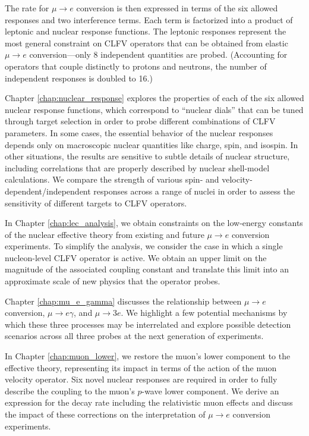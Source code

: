 \documentclass[12pt,letterpaper]{book}
\begin{document}
The rate for $\mu\rightarrow e$ conversion is then expressed in terms of the six allowed responses and two interference terms. Each term is factorized into a product of leptonic and nuclear response functions. The leptonic responses represent the most general constraint on CLFV operators that can be obtained from elastic $\mu\rightarrow e$ conversion---only 8 independent quantities are probed. (Accounting for operators that couple distinctly to protons and neutrons, the number of independent responses is doubled to 16.) 

Chapter \ref{chap:nuclear_response} explores the properties of each of the six allowed nuclear response functions, which correspond to ``nuclear dials'' that can be tuned through target selection in order to probe different combinations of CLFV parameters. In some cases, the essential behavior of the nuclear responses depends only on macroscopic nuclear quantities like charge, spin, and isospin. In other situations, the results are sensitive to subtle details of nuclear structure, including correlations that are properly described by nuclear shell-model calculations. We compare the strength of various spin- and velocity-dependent/independent responses across a range of nuclei in order to assess the sensitivity of different targets to CLFV operators.

In Chapter \ref{chap:lec_analysis}, we obtain constraints on the low-energy constants of the nuclear effective theory from existing and future $\mu\rightarrow e$ conversion experiments. To simplify the analysis, we consider the case in which a single nucleon-level CLFV operator is active. We obtain an upper limit on the magnitude of the associated coupling constant and translate this limit into an approximate scale of new physics that the operator probes.

Chapter \ref{chap:mu_e_gamma} discusses the relationship between $\mu\rightarrow e$ conversion, $\mu\rightarrow e\gamma$, and $\mu\rightarrow 3e$. We highlight a few potential mechanisms by which these three processes may be interrelated and explore possible detection scenarios across all three probes at the next generation of experiments.

In Chapter \ref{chap:muon_lower}, we restore the muon's lower component to the effective theory, representing its impact in terms of the action of the muon velocity operator. Six novel nuclear responses are required in order to fully describe the coupling to the muon's $p$-wave lower component. We derive an expression for the decay rate including the relativistic muon effects and discuss the impact of these corrections on the interpretation of $\mu\rightarrow e$ conversion experiments.
\end{document}
